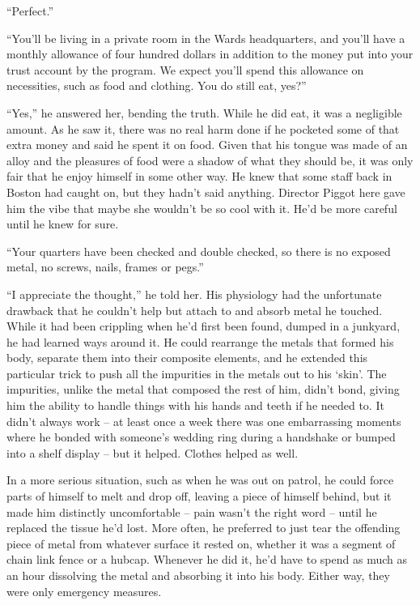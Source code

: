 ``Perfect.''



``You'll be living in a private room in the Wards headquarters, and you'll have a monthly allowance of four hundred dollars in addition to the money put into your trust account by the program.  We expect you'll spend this allowance on necessities, such as food and clothing.  You do still eat, yes?''



``Yes,'' he answered her, bending the truth.  While he did eat, it was a negligible amount.  As he saw it, there was no real harm done if he pocketed some of that extra money and said he spent it on food.  Given that his tongue was made of an alloy and the pleasures of food were a shadow of what they should be, it was only fair that he enjoy himself in some other way.  He knew that some staff back in Boston had caught on, but they hadn't said anything.  Director Piggot here gave him the vibe that maybe she wouldn't be so cool with it.  He'd be more careful until he knew for sure.



``Your quarters have been checked and double checked, so there is no exposed metal, no screws, nails, frames or pegs.''



``I appreciate the thought,'' he told her.  His physiology had the unfortunate drawback that he couldn't help but attach to and absorb metal he touched.  While it had been crippling when he'd first been found, dumped in a junkyard, he had learned ways around it.  He could rearrange the metals that formed his body, separate them into their composite elements, and he extended this particular trick to push all the impurities in the metals out to his `skin'.  The impurities, unlike the metal that composed the rest of him, didn't bond, giving him the ability to handle things with his hands and teeth if he needed to.  It didn't always work – at least once a week there was one embarrassing moments where he bonded with someone's wedding ring during a handshake or bumped into a shelf display – but it helped.  Clothes helped as well.



In a more serious situation, such as when he was out on patrol, he could force parts of himself to melt and drop off, leaving a piece of himself behind, but it made him distinctly uncomfortable – pain wasn't the right word – until he replaced the tissue he'd lost.  More often, he preferred to just tear the offending piece of metal from whatever surface it rested on, whether it was a segment of chain link fence or a hubcap.  Whenever he did it, he'd have to spend as much as an hour dissolving the metal and absorbing it into his body.  Either way, they were only emergency measures.




